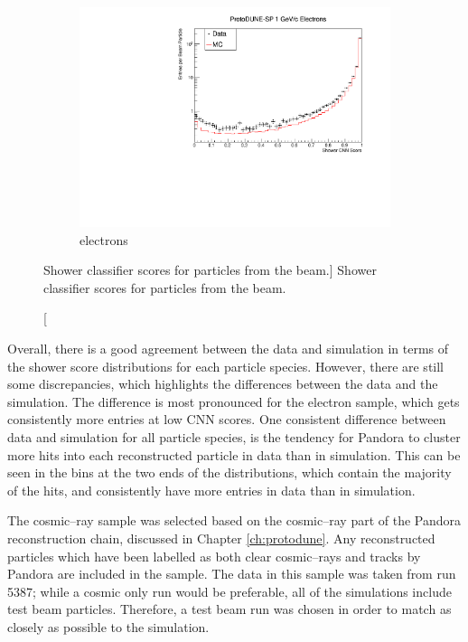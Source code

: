 \begin{figure}
	\begin{subfigure}[b]{0.7\textwidth}
		\centering
		\includegraphics[width=\textwidth]{figures/hit_cnn_electron.pdf}
		\caption {electrons}
		\label{fig:beam_electron_cnn}
	\end{subfigure}

	\caption
	[Shower classifier scores for particles from the \protodune{} beam.]
	{Shower classifier scores for particles from the \protodune{} beam.}

	\label{fig:cnn_scores_beam}

\end{figure}

Overall, there is a good agreement between the data and simulation in terms of
the shower score distributions for each particle species. However, there are
still some discrepancies, which highlights the differences between the data and
the simulation. The difference is most pronounced for the electron sample, which
gets consistently more entries at low CNN scores. One consistent difference
between data and simulation for all particle species, is the tendency for 
Pandora to cluster more hits into each reconstructed particle in data than in 
simulation. This can be seen in the bins at the two ends of the distributions,
which contain the majority of the hits, and consistently have more entries in 
data than in simulation.

The cosmic--ray sample was selected based on the cosmic--ray part of the
Pandora reconstruction chain, discussed in Chapter \ref{ch:protodune}. Any
reconstructed particles which have been labelled as both clear cosmic--rays
and tracks by Pandora are included in the sample. The data in this sample was
taken from run 5387; while a cosmic only run would be preferable, all of the
\protodune{} simulations include test beam particles. Therefore, a test beam
run was chosen in order to match as closely as possible to the simulation.

